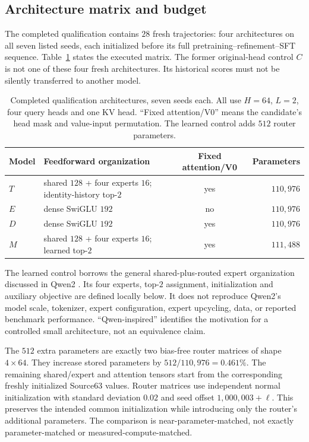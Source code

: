\documentclass{article}
\begin{document}
\subsection{Architecture matrix and budget}
The completed qualification contains $28$ fresh trajectories: four architectures on all seven listed seeds, each initialized before its full pretraining--refinement--SFT sequence. Table~\ref{tab:qualification} states the executed matrix. The former original-head control $C$ is not one of these four fresh architectures. Its historical scores must not be silently transferred to another model.

\begin{table}[t]
\centering
\caption{Completed qualification architectures, seven seeds each. All use $H=64$, $L=2$, four query heads and one KV head. ``Fixed attention/V0'' means the candidate's head mask and value-input permutation. The learned control adds $512$ router parameters.}
\label{tab:qualification}
\begin{tabularx}{\textwidth}{@{}lXcr@{}}
\toprule
Model & Feedforward organization & Fixed attention/V0 & Parameters\\
\midrule
$T$ & shared $128$ + four experts $16$; identity-history top-$2$ & yes & $110{,}976$\\
$E$ & dense SwiGLU $192$ & no & $110{,}976$\\
$D$ & dense SwiGLU $192$ & yes & $110{,}976$\\
$M$ & shared $128$ + four experts $16$; learned top-$2$ & yes & $111{,}488$\\
\bottomrule
\end{tabularx}
\end{table}

The learned control borrows the general shared-plus-routed expert organization discussed in Qwen2 \citep{yang2024qwen2}. Its four experts, top-$2$ assignment, initialization and auxiliary objective are defined locally below. It does not reproduce Qwen2's model scale, tokenizer, expert configuration, expert upcycling, data, or reported benchmark performance. ``Qwen-inspired'' identifies the motivation for a controlled small architecture, not an equivalence claim.

The $512$ extra parameters are exactly two bias-free router matrices of shape $4\times64$. They increase stored parameters by $512/110{,}976=0.461\%$. The remaining shared/expert and attention tensors start from the corresponding freshly initialized Source63 values. Router matrices use independent normal initialization with standard deviation $0.02$ and seed offset $1{,}000{,}003+\ell$. This preserves the intended common initialization while introducing only the router's additional parameters. The comparison is near-parameter-matched, not exactly parameter-matched or measured-compute-matched.
\end{document}

